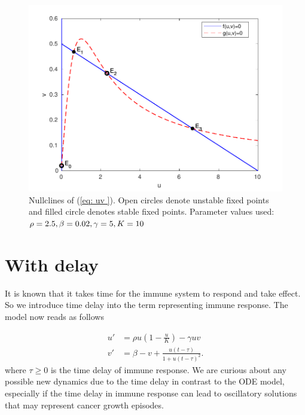 \documentclass{aims}
\theoremstyle{definition}
\begin{document}
\begin{figure}[tph]
\begin{centering}
\includegraphics[scale=0.6]{explore/plots/nullclines/nullclines-new}
\par\end{centering}
\caption{\label{fig:Nullclines}Nullclines of (\ref{eq: uv }). Open circles
denote unstable fixed points and filled circle denotes stable fixed
points. Parameter values used: $\rho=2.5,\text{\ensuremath{\beta=0.02,\gamma=5,K=10}}$ }
\end{figure}


\section{With delay}

It is known that it takes time for the immune system to respond and
take effect. So we introduce time delay into the term representing
immune response. The model now reads as follows 

\begin{subequations}\label{eq:main delay}
\begin{align}
u' & =\rho u(1-\frac{u}{K})-\gamma uv\\
v' & =\beta-v+\frac{u(t-\tau)}{1+u(t-\tau)^{2}}.
\end{align}
\end{subequations}
where $\tau \ge 0$ is the time delay of immune response. We are curious about any possible new dynamics due to the time delay in contrast to the ODE model, especially if the time delay in immune response can lead to oscillatory solutions that may represent cancer growth episodes. 
\end{document}

